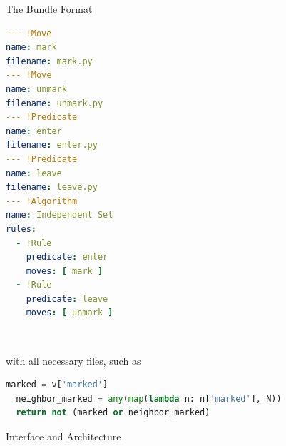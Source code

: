 \documentclass{beamer}
\begin{document}
\begin{frame}[fragile,t]
\begin{columns}[t]
\begin{column}{.45\textwidth}
\begin{block}{The Bundle Format}
        \begin{minipage}{\linewidth}
          \hfill
          \begin{minipage}{5in}
\begin{lstlisting}[language=yaml,basicstyle=\ttfamily\YAMLkeystyle]
--- !Move
name: mark
filename: mark.py
--- !Move
name: unmark
filename: unmark.py
--- !Predicate
name: enter
filename: enter.py
--- !Predicate
name: leave
filename: leave.py
--- !Algorithm
name: Independent Set
rules:
  - !Rule
    predicate: enter
    moves: [ mark ]
  - !Rule
    predicate: leave
    moves: [ unmark ]
\end{lstlisting}
          \end{minipage}
          \hfill
          \begin{minipage}{4in}
          \end{minipage}
          \hfill
          ~
        \end{minipage}

        with all necessary files, such as 
        \vspace{.3in}
\begin{lstlisting}[language=Python,stringstyle=\color{green!50!black},keywordstyle=\color{blue}]
  marked = v['marked']
  neighbor_marked = any(map(lambda n: n['marked'], N))
  return not (marked or neighbor_marked)
\end{lstlisting}
      \end{block}
      
      \begin{block}{Interface and Architecture}
        \vspace*{-.1ex}


\end{block}
\end{column}
\end{columns}
\end{frame}
\end{document}
